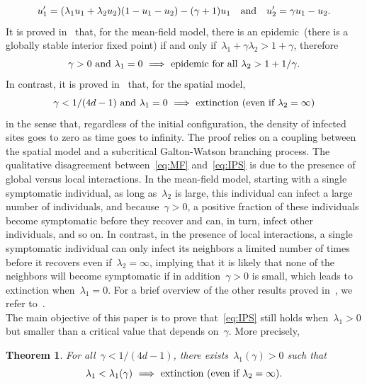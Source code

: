 \documentclass[letterpaper,11pt,twoside,keywordsasfootnote,addressatend,noinfoline]{article}
\newtheorem{theorem}{Theorem}
\begin{document}
 $$ u_1' = (\lambda_1 u_1 + \lambda_2 u_2)(1 - u_1 - u_2) - (\gamma + 1) u_1 \quad \hbox{and} \quad u_2' = \gamma u_1 - u_2. $$
 It is proved in~\cite[Section~2]{belhadi_lanchier_mercer_2024} that, for the mean-field model, there is an epidemic~(there is a globally stable interior fixed point) if and only if~$\lambda_1 + \gamma \lambda_2 > 1 + \gamma$, therefore
\begin{equation}
\label{eq:MF}
\gamma > 0 \ \hbox{and} \ \lambda_1 = 0 \ \Longrightarrow \ \hbox{epidemic for all} \ \lambda_2 > 1 + 1 / \gamma.
\end{equation}
 In contrast, it is proved in~\cite[Section~6]{belhadi_lanchier_mercer_2024} that, for the spatial model,
\begin{equation}
\label{eq:IPS}
\gamma < 1 / (4d - 1) \ \hbox{and} \ \lambda_1 = 0 \ \Longrightarrow \ \hbox{extinction} \ (\hbox{even if} \ \lambda_2 = \infty)
\end{equation}
 in the sense that, regardless of the initial configuration, the density of infected sites goes to zero as time goes to infinity.
 The proof relies on a coupling between the spatial model and a subcritical Galton-Watson branching process.
 The qualitative disagreement between~\eqref{eq:MF} and~\eqref{eq:IPS} is due to the presence of global versus local interactions.
 In the mean-field model, starting with a single symptomatic individual, as long as~$\lambda_2$ is large, this individual can infect a large number of individuals, and because~$\gamma > 0$, a positive fraction of these individuals become symptomatic before they recover and can, in turn, infect other individuals, and so on.
 In contrast, in the presence of local interactions, a single symptomatic individual can only infect its neighbors a limited number of times before it recovers even if~$\lambda_2 = \infty$, implying that it is likely that none of the neighbors will become symptomatic if in addition~$\gamma > 0$ is small, which leads to extinction when~$\lambda_1 = 0$.
 For a brief overview of the other results proved in~\cite{belhadi_lanchier_mercer_2024}, we refer to~\cite[Section~2.1.5]{lanchier_2024}. \\
\indent
 The main objective of this paper is to prove that~\eqref{eq:IPS} still holds when~$\lambda_1 > 0$ but smaller than a critical value that depends on~$\gamma$.
 More precisely,
\begin{theorem}
\label{th:extinction}
 For all~$\gamma < 1 / (4d - 1)$, there exists~$\lambda_1 (\gamma) > 0$ such that
 $$ \lambda_1 < \lambda_1 (\gamma) \ \Longrightarrow \ \hbox{extinction} \ (\hbox{even if~$\lambda_2 = \infty$)}. $$
\end{theorem}
\end{document}
